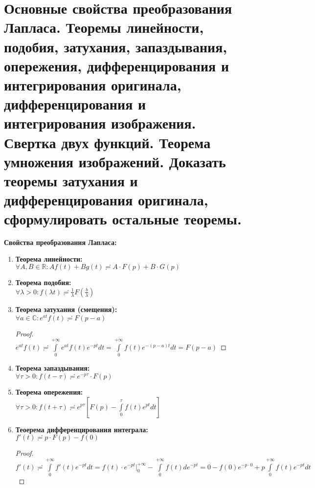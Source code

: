 \newpage
\section{Основные свойства преобразования Лапласа. Теоремы линейности, подобия, затухания, запаздывания, опережения, дифференцирования и интегрирования оригинала, дифференцирования и интегрирования изображения. Свертка двух функций. Теорема умножения изображений. Доказать теоремы затухания и дифференцирования оригинала, сформулировать остальные теоремы.}

\textbf{Свойства преобразования Лапласа:}

\begin{enumerate}
    \item \textbf{Теорема линейности:}\\
    $\forall A, B \in \mathbb{R}: Af(t)+Bg(t)\risingdotseq A\cdot F(p)+B\cdot G(p)$
    \item \textbf{Теорема подобия:}\\
    $\forall \lambda > 0: f(\lambda t) \risingdotseq \frac{1}{\lambda} F\left(\frac{b}{\lambda}\right)$
    \item \textbf{Теорема затухания (смещения):}\\
    $\forall a \in \mathbb{C}: e^{at}f(t)\risingdotseq F(p-a)$\\
    \begin{proof}
        \ \\
        $e^{at}f(t)\risingdotseq \int\limits_0^{+\infty} e^{at}f(t)e^{-pt}dt=\int\limits_0^{+\infty}f(t)e^{-(p-a)t}dt=F(p-a)$
    \end{proof}
    \item \textbf{Теорема запаздывания:}\\
    $\forall \tau > 0: f(t-\tau) \risingdotseq e^{-p\tau}\cdot F(p)$
    \item \textbf{Теорема опережения:}\\
    $\forall \tau > 0: f(t+\tau) \risingdotseq e^{p\tau}\left[F(p)-\int\limits_0^{\tau}f(t)e^{pt}dt\right]$
    \item \textbf{Теоерема дифференцирования интеграла:}\\
    $f'(t)\risingdotseq p\cdot F(p) -f(0)$
    \begin{proof}
        \ \\
        $f'(t)\risingdotseq \int\limits_0^{+\infty}f'(t)e^{-pt}dt = f(t)\cdot e^{-pt}\bigg|_0^{+\infty} -\int\limits_0^{+\infty} f(t) de^{-pt} = 0 -f(0)e^{-p\cdot 0}+p\int\limits_0^{+\infty}f(t)e^{-pt}dt$\\

\end{proof}
\end{enumerate}
